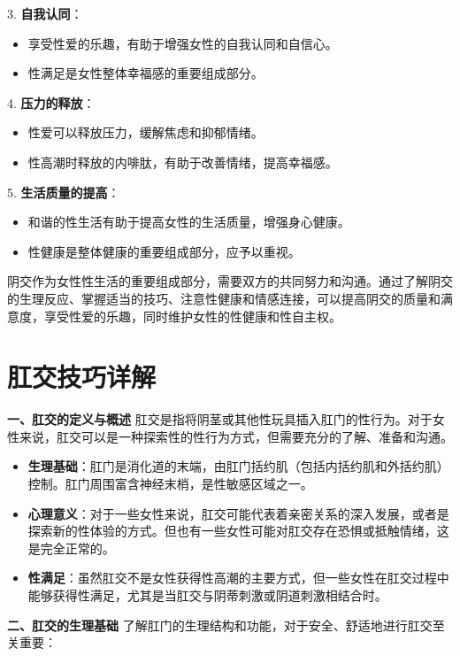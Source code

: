 \documentclass[12pt,UTF8]{ctexbook}
\begin{document}
3. \textbf{自我认同}：
\begin{itemize}
	\item 享受性爱的乐趣，有助于增强女性的自我认同和自信心。
	\item 性满足是女性整体幸福感的重要组成部分。
\end{itemize}

4. \textbf{压力的释放}：
\begin{itemize}
	\item 性爱可以释放压力，缓解焦虑和抑郁情绪。
	\item 性高潮时释放的内啡肽，有助于改善情绪，提高幸福感。
\end{itemize}

5. \textbf{生活质量的提高}：
\begin{itemize}
	\item 和谐的性生活有助于提高女性的生活质量，增强身心健康。
	\item 性健康是整体健康的重要组成部分，应予以重视。
\end{itemize}

阴交作为女性性生活的重要组成部分，需要双方的共同努力和沟通。通过了解阴交的生理反应、掌握适当的技巧、注意性健康和情感连接，可以提高阴交的质量和满意度，享受性爱的乐趣，同时维护女性的性健康和性自主权。

\chapter{肛交技巧详解}

\textbf{一、肛交的定义与概述}
肛交是指将阴茎或其他性玩具插入肛门的性行为。对于女性来说，肛交可以是一种探索性的性行为方式，但需要充分的了解、准备和沟通。

\begin{itemize}
	\item \textbf{生理基础}：肛门是消化道的末端，由肛门括约肌（包括内括约肌和外括约肌）控制。肛门周围富含神经末梢，是性敏感区域之一。
	\item \textbf{心理意义}：对于一些女性来说，肛交可能代表着亲密关系的深入发展，或者是探索新的性体验的方式。但也有一些女性可能对肛交存在恐惧或抵触情绪，这是完全正常的。
	\item \textbf{性满足}：虽然肛交不是女性获得性高潮的主要方式，但一些女性在肛交过程中能够获得性满足，尤其是当肛交与阴蒂刺激或阴道刺激相结合时。
\end{itemize}

\textbf{二、肛交的生理基础}
了解肛门的生理结构和功能，对于安全、舒适地进行肛交至关重要：
\end{document}
